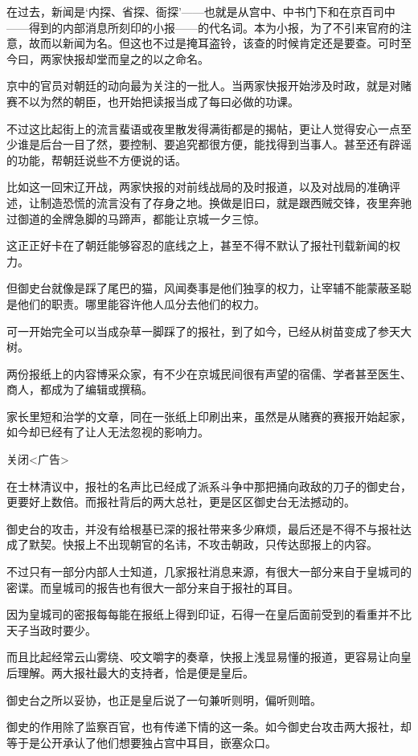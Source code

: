 在过去，新闻是‘内探、省探、衙探’——也就是从宫中、中书门下和在京百司中——得到的内部消息所刻印的小报——的代名词。本为小报，为了不引来官府的注意，故而以新闻为名。但这也不过是掩耳盗铃，该查的时候肯定还是要查。可时至今曰，两家快报却堂而皇之的以之命名。

京中的官员对朝廷的动向最为关注的一批人。当两家快报开始涉及时政，就是对赌赛不以为然的朝臣，也开始把读报当成了每曰必做的功课。

不过这比起街上的流言蜚语或夜里散发得满街都是的揭帖，更让人觉得安心一点至少谁是后台一目了然，要控制、要追究都很方便，能找得到当事人。甚至还有辟谣的功能，帮朝廷说些不方便说的话。

比如这一回宋辽开战，两家快报的对前线战局的及时报道，以及对战局的准确评述，让制造恐慌的流言没有了存身之地。换做是旧曰，就是跟西贼交锋，夜里奔驰过御道的金牌急脚的马蹄声，都能让京城一夕三惊。

这正正好卡在了朝廷能够容忍的底线之上，甚至不得不默认了报社刊载新闻的权力。

但御史台就像是踩了尾巴的猫，风闻奏事是他们独享的权力，让宰辅不能蒙蔽圣聪是他们的职责。哪里能容许他人瓜分去他们的权力。

可一开始完全可以当成杂草一脚踩了的报社，到了如今，已经从树苗变成了参天大树。

两份报纸上的内容博采众家，有不少在京城民间很有声望的宿儒、学者甚至医生、商人，都成为了编辑或撰稿。

家长里短和治学的文章，同在一张纸上印刷出来，虽然是从赌赛的赛报开始起家，如今却已经有了让人无法忽视的影响力。

关闭<广告>

在士林清议中，报社的名声比已经成了派系斗争中那把捅向政敌的刀子的御史台，更要好上数倍。而报社背后的两大总社，更是区区御史台无法撼动的。

御史台的攻击，并没有给根基已深的报社带来多少麻烦，最后还是不得不与报社达成了默契。快报上不出现朝官的名讳，不攻击朝政，只传达邸报上的内容。

不过只有一部分内部人士知道，几家报社消息来源，有很大一部分来自于皇城司的密谍。而皇城司的报告也有很大一部分来自于报社的耳目。

因为皇城司的密报每每能在报纸上得到印证，石得一在皇后面前受到的看重并不比天子当政时要少。

而且比起经常云山雾绕、咬文嚼字的奏章，快报上浅显易懂的报道，更容易让向皇后理解。两大报社最大的支持者，恰是便是皇后。

御史台之所以妥协，也正是皇后说了一句兼听则明，偏听则暗。

御史的作用除了监察百官，也有传递下情的这一条。如今御史台攻击两大报社，却等于是公开承认了他们想要独占宫中耳目，嵌塞众口。

